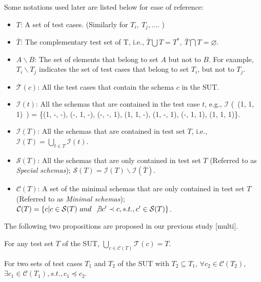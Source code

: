 Some notations used later are listed below for ease of reference:
\begin{itemize}
\item $T$: A set of test cases. (Similarly for $T_{i},\ T_{j}, ...$. )
\item $\bar{T}$: The complementary test set of T, i.e., $\bar{T} \bigcup T = T^{*},\ \bar{T} \bigcap T = \varnothing$.
\item $A \backslash B$:  The set of elements that belong to set $A$ but not to $B$. For example, $T_{i} \backslash T_{j}$ indicates the set of test cases that belong to set $T_{i}$, but not to $T_{j}$.
\item $\mathcal{T}(c)$:  All the test cases that contain the schema $c$ in the SUT.
\item $\mathcal{I}(t)$:  All the schemas that are contained in the test case $t$, e.g., $\mathcal{I}$ (\ (1, 1, 1)\ ) = \{(1, -, -), (-, 1, -), (-, -, 1), (1, 1, -), (1, -, 1), (-, 1, 1), (1, 1, 1)\}.
\item $\mathcal{I}(T)$:  All the schemas that are contained in test set $T$, i.e., $\mathcal{I}(T) = \bigcup_{t\in T} \mathcal{I}(t)$.
\item  $\mathcal{S}(T)$:  All the schemas that are only contained in test set $T$ (Referred to as \emph{Special schemas}); $\mathcal{S}(T) =  \mathcal{I}(T) \backslash \mathcal{I}(\bar{T}) $.
\item  $\mathcal{C}(T)$: A set of the minimal schemas that are only contained in test set $T$ (Referred to as \emph{Minimal schemas}); $\mathcal{C}(T) =  \{c | c \in \mathcal{S}(T)\ and\ \not\exists c' \prec c, s.t., c' \in \mathcal{S}(T)\}$.
\end{itemize}

The following two propositions are proposed in our previous study [multi].

\begin{proposition}\label{pro:ash}
For any test set $T$ of the SUT, $\bigcup_{c \in \mathcal{C}(T)} \mathcal{T}(c) = T$.
\end{proposition}


\begin{proposition}\label{pro:ssp}
For two sets of test cases $T_{1}$ and $T_{2}$ of the SUT with $T_{2} \subseteq T_{1}$, $\forall c_{2} \in \mathcal{C}(T_{2})$, $\exists c_{1} \in \mathcal{C}(T_{1}), s.t., c_{1} \preceq c_{2}$.
\end{proposition}

